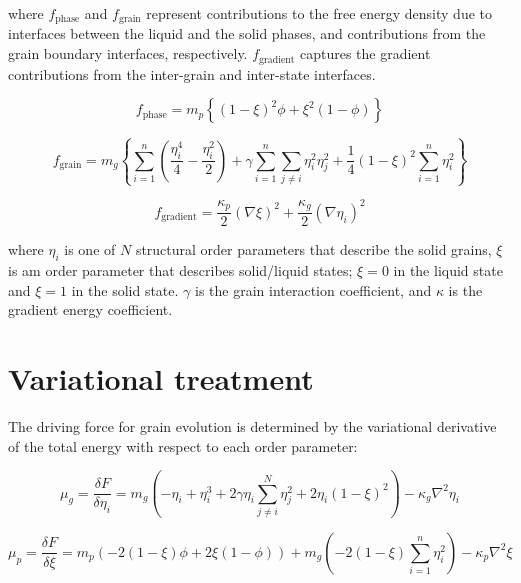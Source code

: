 \documentclass[10pt]{article}
\begin{document}
where $f_{\mathrm{phase}}$ and $f_{\mathrm{grain}}$ represent contributions to the free energy density due to interfaces between the liquid and the solid phases, and contributions from the grain boundary interfaces, respectively. $f_{\mathrm{gradient}}$ captures the gradient contributions from the inter-grain and inter-state interfaces. 

\begin{equation}
f_{\mathrm{phase}}=m_{p}\left\{ \left(1-\xi\right)^{2}\phi+\xi^{2}\left(1-\phi\right)\right\} \label{eq:f_phase}
\end{equation}

\begin{equation}
f_{\mathrm{grain}}=m_{g} \left\{ \sum_{i=1}^{n}\left(\frac{\eta_{i}^{4}}{4}-\frac{\eta_{i}^{2}}{2}\right)+\gamma\sum_{i=1}^{n}\sum_{j\neq i}\eta_{i}^{2}\eta_{j}^{2}+\frac{1}{4}\left(1-\xi\right)^{2}\sum_{i=1}^{n}\eta_{i}^{2}\right\} \label{eq:f_grain}
\end{equation}

\begin{equation}
f_{\mathrm{gradient}}=\frac{\kappa_{p}}{2}\left(\nabla\xi\right)^{2}+\frac{\kappa_{g}}{2}\left(\nabla\eta_{i}\right)^{2}\label{eq:f_gradient}
\end{equation}


where $\eta_i$ is one of $N$ structural order parameters that describe the solid grains, $\xi$ is am order parameter that describes solid/liquid states; $\xi=0$ in the liquid state and $\xi=1$ in the solid state.  $\gamma$ is the grain interaction coefficient, and $\kappa$ is the gradient energy coefficient.
	
\section{Variational treatment}
The driving force for grain evolution is determined by the variational derivative of the total energy with respect to each order parameter:

\begin{equation}
\mu_g = \frac{\delta F}{\delta \eta_i} = m_g \left( -\eta_i + \eta_i^3 + 2 \gamma \eta_i \sum_{j \ne i}^N \eta_j^2 +2\eta_i\left( 1-\xi \right)^2  \right) - \kappa_g \nabla^2 \eta_i
\end{equation}

\begin{equation}
\mu_p = \frac{\delta F}{\delta \xi} = m_p \left(  -2 \left( 1- \xi \right) \phi +2 \xi \left( 1- \phi \right)  \right) + m_g \left( -2 \left( 1-\xi \right) \sum_{i=1}^{n} \eta_i^2 \right) - \kappa_p \nabla^2 \xi
\end{equation}
\end{document}
